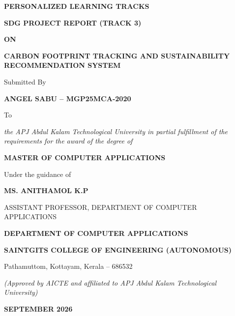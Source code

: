 \documentclass[12pt,a4paper]{report}
\begin{document}
\begin{titlepage}
    \centering
    
    {\bfseries\large PERSONALIZED LEARNING TRACKS \par}
    {\bfseries\large SDG PROJECT REPORT (TRACK 3) \par}
    \vspace{0.3cm}
    {\bfseries ON \par}
    \vspace{0.4cm}
    {\Large\bfseries CARBON FOOTPRINT TRACKING AND SUSTAINABILITY RECOMMENDATION SYSTEM \par}
    
    \vspace{1.2cm}
    {\large Submitted By \par}
    \vspace{0.1cm}
    {\bfseries\large ANGEL SABU -- MGP25MCA-2020 \par}
    
    \vspace{1.0cm}
    {\large To \par}
    \vspace{0.1cm}
    {\itshape the APJ Abdul Kalam Technological University in partial fulfillment of the requirements for the award of the degree of \par}
    \vspace{0.2cm}
    {\bfseries\large MASTER OF COMPUTER APPLICATIONS \par}
    
    \vspace{1.2cm}
    {\large Under the guidance of \par}
    \vspace{0.1cm}
    {\bfseries\large MS. ANITHAMOL K.P \par}
    {\small ASSISTANT PROFESSOR, DEPARTMENT OF COMPUTER APPLICATIONS \par}
    
    \vfill
    
    {\bfseries\large DEPARTMENT OF COMPUTER APPLICATIONS \par}
    {\bfseries\large SAINTGITS COLLEGE OF ENGINEERING (AUTONOMOUS) \par}
    {\small Pathamuttom, Kottayam, Kerala -- 686532 \par}
    {\itshape\small (Approved by AICTE and affiliated to APJ Abdul Kalam Technological University) \par}
    \vspace{0.4cm}
    {\bfseries\large SEPTEMBER 2026 \par}
\end{titlepage}
\end{document}
